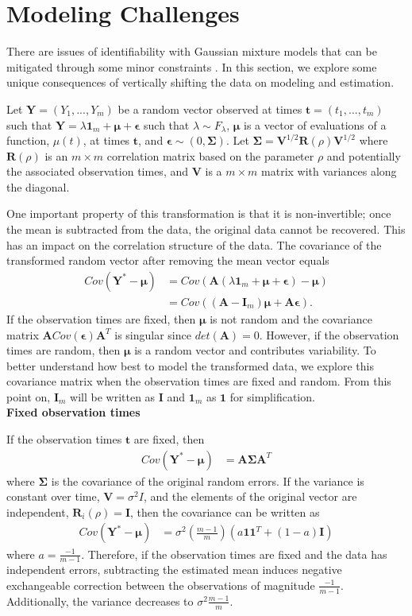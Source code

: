 \documentclass[12pt]{article}
\newcommand{\B}[0]{\mathbf}
\newcommand{\BS}[0]{\boldsymbol}
\begin{document}
\section{Modeling Challenges}
There are issues of identifiability with Gaussian mixture models that can be mitigated through some minor constraints \cite{mclachlan2000}. In this section, we explore some unique consequences of vertically shifting the data on modeling and estimation.

Let $\B Y=(Y_{1},...,Y_{m})$ be a random vector observed at times $\B t=(t_{1},...,t_{m})$ such that
$\B Y = \lambda\B 1_{m} + \BS\mu + \BS\epsilon$
such that $\lambda\sim F_{\lambda}$, $\BS\mu$ is a vector of evaluations of a function, $\mu(t)$, at times $\B t$, and $\BS\epsilon\sim(0,\BS\Sigma)$. Let $\B\Sigma =\B V^{1/2}\B R(\rho)\B V^{1/2}$ where $\B R(\rho)$ is an $m\times m$ correlation matrix based on the parameter $\rho$ and potentially the associated observation times, and $\B V$ is a $m\times m$ matrix with variances along the diagonal. 

 One important property of this transformation is that it is non-invertible; once the mean is subtracted from the data, the original data cannot be recovered. This has an impact on the correlation structure of the data. The covariance of the transformed random vector after removing the mean vector equals
\begin{align*}
Cov(\B Y^{*} - \BS\mu) &= Cov(\B A(\lambda\B 1_{m} + \BS\mu + \BS\epsilon) - \BS\mu)\\
&= Cov((\B A-\B I_{m})\BS\mu + \B A \BS\epsilon).
\end{align*}
If the observation times are fixed, then $\BS \mu$ is not random and the covariance matrix $\B A Cov(\BS\epsilon)\B A^{T}$ is singular since $det(\B A) =0$. However, if the observation times are random, then $\BS \mu$ is a random vector and contributes variability. To better understand how best to model the transformed data, we explore this covariance matrix when the observation times are fixed and random. From this point on, $\B I_{m}$ will be written as $\B I$ and $\B 1_{m}$ as $\B 1$ for simplification.\\

\noindent \textbf{Fixed observation times}

If the observation times $\B t$ are fixed, then
\begin{align*}
Cov(\B Y^{*} - \BS\mu) &= \B A\BS\Sigma \B A^{T}
\end{align*}
where $\BS\Sigma$ is the covariance of the original random errors. If the variance is constant over time, $\B V=\sigma^{2}I$, and the elements of the original vector are independent, $\B R_{i}(\rho)=\B I$, then the covariance can be written as
\begin{align*} 
Cov(\B Y^{*}- \BS\mu) &=\sigma^{2}\left(\frac{m-1}{m}\right)(a\B 1\B 1^{T}+ (1-a)\B I)
\end{align*}
 where $a=\frac{-1}{m-1}$. Therefore, if the observation times are fixed and the data has independent errors, subtracting the estimated mean induces negative exchangeable correction between the observations of magnitude $\frac{-1}{m-1}$. Additionally, the variance decreases to $\sigma^{2}\frac{m-1}{m}$.
 
\end{document}
